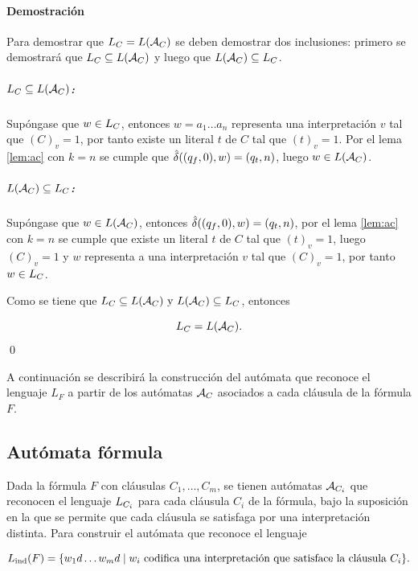 \paragraph{Demostración}
Para demostrar que $L_{C} = L(\mathcal{A}_{C})$ se deben demostrar dos inclusiones: primero se demostrará que $L_{C} \subseteq L(\mathcal{A}_{C})$ y luego que $L(\mathcal{A}_{C}) \subseteq L_{C}$.

\subparagraph{$L_{C} \subseteq L(\mathcal{A}_{C})$:}

\hfill

Supóngase que $w \in L_{C}$, entonces $w = a_{1} \ldots a_{n}$ representa una interpretación $v$ tal que $(C)_v = 1$, por tanto existe un literal $t$ de $C$ tal que $(t)_v = 1$. Por el lema \ref{lem:ac} con $k = n$ se cumple que $\hat{\delta}((q_f, 0), w) = (q_t, n)$, luego $w \in L(\mathcal{A}_{C})$.

\subparagraph{$L(\mathcal{A}_{C}) \subseteq L_{C}$:}

\hfill

Supóngase que $w \in L(\mathcal{A}_{C})$, entonces $\hat{\delta}((q_f, 0), w) = (q_t, n)$, por el lema \ref{lem:ac} con $k = n$ se cumple que existe un literal $t$ de $C$ tal que $(t)_v = 1$, luego $(C)_v = 1$ y $w$ representa a una interpretación $v$ tal que $(C)_v = 1$, por tanto $w \in L_{C}$.

Como se tiene que $L_{C} \subseteq L(\mathcal{A}_{C}) \text{ y } L(\mathcal{A}_{C}) \subseteq L_{C}$, entonces

$$
    L_{C} = L(\mathcal{A}_{C}).
$$
\qed

A continuación se describirá la construcción del autómata que reconoce el lenguaje $L_F$ a partir de los autómatas $\mathcal{A}_{C}$ asociados a cada cláusula de la fórmula $F$.

\subsection{Autómata fórmula}

Dada la fórmula $F$ con cláusulas $C_1, \ldots, C_m$, se tienen autómatas $\mathcal{A}_{C_i}$ que reconocen el lenguaje $L_{C_i}$ para cada cláusula $C_i$ de la fórmula, bajo la suposición en la que se permite que cada cláusula se satisfaga por una interpretación distinta. Para construir el autómata que reconoce el lenguaje

$$
    L_{\mathrm{ind}}(F) = \{ w_1 d \ldots  w_m d \;|\; w_i \text{ codifica una interpretación que satisface la cláusula } C_i\}.
$$

